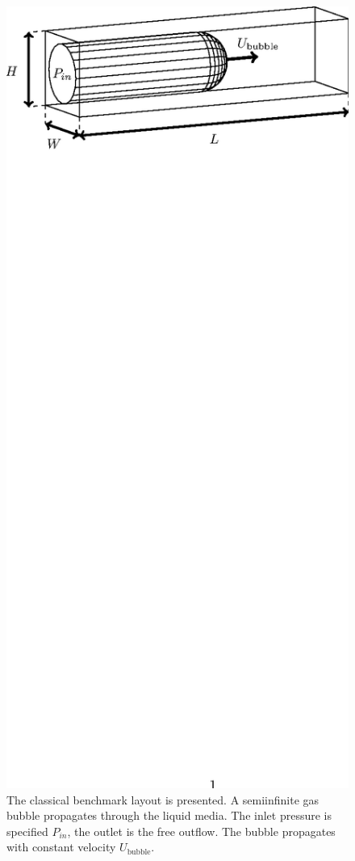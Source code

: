 \documentclass{article}
\begin{document}
\begin{figure}[ht]
\includegraphics*[bb=153 610 405 717,width=\textwidth]{Figures/benchmark_classical.eps} 
\caption{The classical benchmark layout is presented. A semiinfinite gas bubble
propagates through the liquid media. The inlet pressure is specified $P_{in}$, the outlet is the
free outflow. The bubble propagates with constant velocity $U_{\mathrm{bubble}}$. 
\label{fig:classical:benchmark}}
\end{figure}
\end{document}
